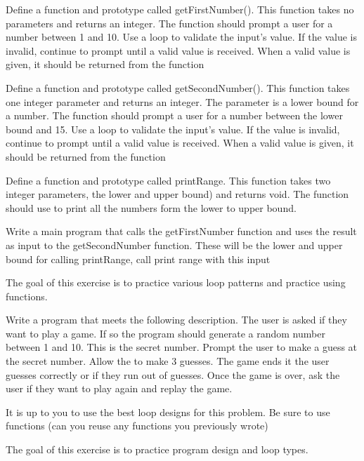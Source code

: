 \begin{exercise}
	Define a function and prototype called getFirstNumber(). This function takes no parameters and returns an integer. The function should prompt a user for a number between 1 and 10. Use a loop to validate the input's value. If the value is invalid, continue to prompt until a valid value is received. When a valid value is given, it should be returned from the function
	
	Define a function and prototype called getSecondNumber(). This function takes one integer parameter and returns an integer. The parameter is a lower bound for a number. The function should prompt a user for a number between the lower bound and 15. Use a loop to validate the input's value. If the value is invalid, continue to prompt until a valid value is received. When a valid value is given, it should be returned from the function
	
	Define a function and prototype called printRange. This function takes two integer parameters, the lower and upper bound) and returns void. The function should use to print all the numbers form the lower to upper bound.
	
	Write a main program that calls the getFirstNumber function and uses the result as input to the getSecondNumber function. These will be the lower and upper bound for calling printRange, call print range with this input
	
	The goal of this exercise is to practice various loop patterns and practice using functions. 
\end{exercise}



\begin{exercise}
	Write a program that meets the following description. 
	The user is asked if they want to play a game. If so the program should generate a random number between 1 and 10. This is the secret number. Prompt the user to make a guess at the secret number. Allow the to make 3 guesses. The game ends it the user guesses correctly or if they run out of guesses. Once the game is over, ask the user if they want to play again and replay the game.
	
	It is up to you to use the best loop designs for this problem. Be sure to use functions (can you reuse any functions you previously wrote)
	
	The goal of this exercise is to practice program design and loop types.
\end{exercise}

